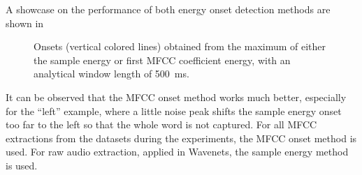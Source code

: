 A showcase on the performance of both energy onset detection methods are shown in 
\begin{figure}[!ht]
  \centering
  \caption{Onsets (vertical colored lines) obtained from the maximum of either the sample energy or first MFCC coefficient energy, with an analytical window length of \SI{500}{\milli\second}.}
  \label{fig:signal_onset_showcase}
\end{figure}
\FloatBarrier
\noindent
It can be observed that the MFCC onset method works much better, especially for the \enquote{left} example, where a little noise peak shifts the sample energy onset too far to the left so that the whole word is not captured.
For all MFCC extractions from the datasets during the experiments, the MFCC onset method is used. 
For raw audio extraction, applied in Wavenets, the sample energy method is used.


